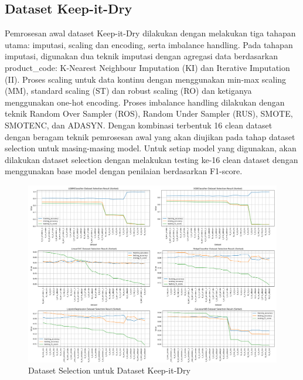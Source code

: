 \documentclass[conference]{IEEEtran}
\begin{document}
\subsection{Dataset Keep-it-Dry}

Pemrosesan awal dataset Keep-it-Dry dilakukan dengan melakukan tiga tahapan utama: imputasi, scaling dan encoding, serta imbalance handling. Pada tahapan imputasi, digunakan dua teknik imputasi dengan agregasi data berdasarkan product\_code: K-Nearest Neighbour Imputation (KI) dan Iterative Imputation (II). 
Proses scaling untuk data kontinu dengan menggunakan min-max scaling (MM), standard scaling (ST) dan robust scaling (RO) dan ketiganya menggunakan one-hot encoding. Proses imbalance handling dilakukan dengan teknik Random Over Sampler (ROS),
Random Under Sampler (RUS), SMOTE, SMOTENC, dan ADASYN. Dengan kombinasi terbentuk 16 clean dataset dengan beragam teknik pemrosesan awal yang akan diujikan pada tahap 
dataset selection untuk masing-masing model. Untuk setiap model yang digunakan, akan dilakukan dataset selection dengan melakukan testing ke-16 
clean dataset dengan menggunakan base model dengan penilaian berdasarkan F1-score.

\begin{figure}[htbp]
    \centerline{\includegraphics[width=\linewidth]{KID_Dataset_Selection.png}}
    \caption{Dataset Selection untuk Dataset Keep-it-Dry}
    \label{kid_datasetselection}
\end{figure}
\end{document}
